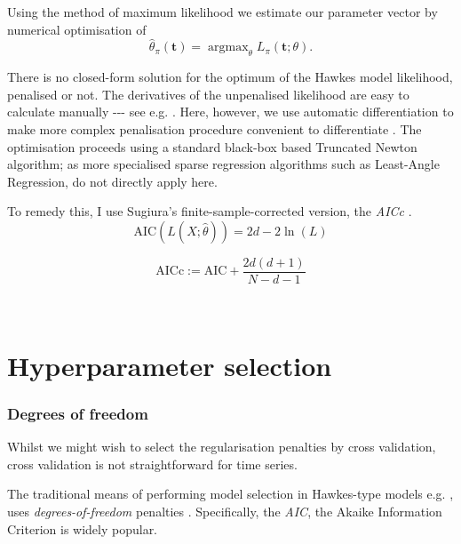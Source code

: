 \documentclass[11pt]{article}
\begin{document}
Using the method of maximum likelihood we estimate our parameter vector
by numerical optimisation of
\[\hat{\theta}_\pi(\mathbf t) = \operatorname{argmax}_\theta L_\pi(\mathbf t;\theta).\]

    There is no closed-form solution for the optimum of the Hawkes model
likelihood, penalised or not. The derivatives of the unpenalised
likelihood are easy to calculate manually -{}-{}- see e.g.
\cite{ozaki_maximum_1979}. Here, however, we use automatic
differentiation to make more complex penalisation procedure convenient
to differentiate \cite{baydin_automatic_2014}. The optimisation proceeds
using a standard black-box based Truncated Newton algorithm; as more
specialised sparse regression algorithms such as Least-Angle Regression,
do not directly apply here.

    To remedy this, I use Sugiura's finite-sample-corrected version, the
\emph{AICc} \cite{sugiura_further_1978}.
\[{\mathrm {AIC}(L(X;\hat{\theta}))}=2d-2\ln(L)\]

\[{\mathrm {AICc}}:={\mathrm {AIC}}+{\frac {2d(d+1)}{N-d-1}}\]



    \begin{center}
    \end{center}
    { \hspace*{\fill} \\}
    
    \section{Hyperparameter selection}\label{hyperparameter-selection}

    \subsubsection{Degrees of freedom}\label{degrees-of-freedom}

Whilst we might wish to select the regularisation penalties by cross
validation, cross validation is not straightforward for time series.

The traditional means of performing model selection in Hawkes-type
models e.g. \cite{ogata_estimation_1983}, uses \emph{degrees-of-freedom}
penalties \cite{efron_how_1886}. Specifically, the \emph{AIC}, the
Akaike Information Criterion \cite{akaike_likelihood_1981} is widely
popular.
\end{document}
